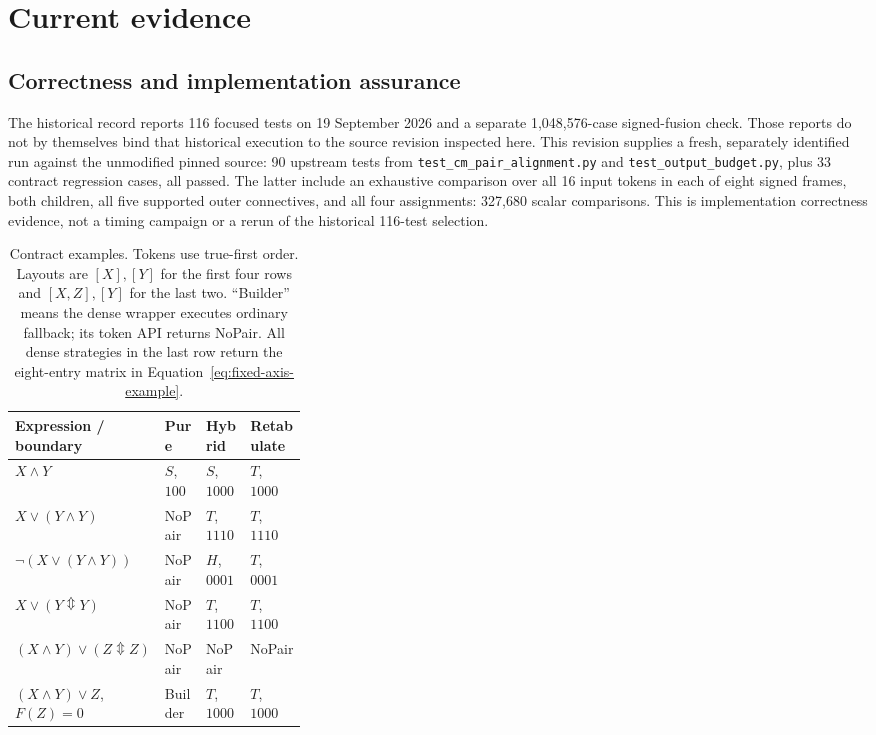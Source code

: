 \documentclass[10pt]{article}
\newcommand{\bxor}{\mathbin{\Updownarrow}}
\theoremstyle{plain}
\theoremstyle{definition}
\theoremstyle{remark}
\begin{document}
\section{Current evidence}
\label{sec:results}

\subsection{Correctness and implementation assurance}
\label{sec:fresh-checks}

The historical record reports 116 focused tests on 19 September 2026 and a separate 1,048,576-case signed-fusion check. Those reports do not by themselves bind that historical execution to the source revision inspected here. This revision supplies a fresh, separately identified run against the unmodified pinned source: 90 upstream tests from \texttt{test\_cm\_pair\_alignment.py} and \texttt{test\_output\_budget.py}, plus 33 contract regression cases, all passed. The latter include an exhaustive comparison over all 16 input tokens in each of eight signed frames, both children, all five supported outer connectives, and all four assignments: 327,680 scalar comparisons. This is implementation correctness evidence, not a timing campaign or a rerun of the historical 116-test selection.

\begin{table}[H]
\small\centering
\begin{tabularx}{\linewidth}{@{}p{0.34\linewidth}XXX@{}}
\toprule
\textbf{Expression / boundary} & \textbf{Pure} & \textbf{Hybrid} & \textbf{Retabulate}\\
\midrule
$X\land Y$ & $S$, $1000$ & $S$, $1000$ & $T$, $1000$\\
$X\lor(Y\land Y)$ & NoPair & $T$, $1110$ & $T$, $1110$\\
$\neg(X\lor(Y\land Y))$ & NoPair & $H$, $0001$ & $T$, $0001$\\
$X\lor(Y\bxor Y)$ & NoPair & $T$, $1100$ & $T$, $1100$\\
$(X\land Y)\lor(Z\bxor Z)$ & NoPair & NoPair & NoPair\\
$(X\land Y)\lor Z$, $F(Z)=0$ & Builder & $T$, $1000$ & $T$, $1000$\\
\bottomrule
\end{tabularx}
\caption{Contract examples. Tokens use true-first order. Layouts are $[X],[Y]$ for the first four rows and $[X,Z],[Y]$ for the last two. ``Builder'' means the dense wrapper executes ordinary fallback; its token API returns NoPair. All dense strategies in the last row return the eight-entry matrix in Equation~\eqref{eq:fixed-axis-example}.}
\label{tab:regressions}
\end{table}
\end{document}
